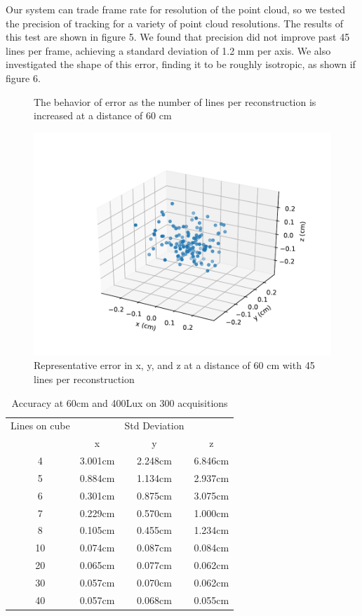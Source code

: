 \documentclass{llncs}
\begin{document}
Our system can trade frame rate for resolution of the point cloud, so we tested the precision of tracking for a variety of point cloud resolutions. The results of this test are shown in figure 5. We found that precision did not improve past 45 lines per frame, achieving a standard deviation of 1.2 mm per axis. We also investigated the shape of this error, finding it to be roughly isotropic, as shown if figure 6. 
\begin{figure}
\caption{The behavior of error as the number of lines per reconstruction is increased at a distance of 60 cm}
\end{figure}
\begin{figure}
\includegraphics[scale=.7]{45_lines_error}
\caption{Representative error in x, y, and z at a distance of 60 cm with 45 lines per reconstruction}
\end{figure}

\begin{table}
\caption{Accuracy at 60cm and 400Lux on 300 acquisitions}
\begin{tabular}{c|ccc}
\hline
\hline
Lines on cube & & Std Deviation & \\
 & x & y & z\\
\hline
4  & 3.001cm & 2.248cm & 6.846cm\\
5  & 0.884cm & 1.134cm & 2.937cm\\
6  & 0.301cm & 0.875cm & 3.075cm\\
7  & 0.229cm & 0.570cm & 1.000cm\\
8  & 0.105cm & 0.455cm & 1.234cm\\
10 & 0.074cm & 0.087cm & 0.084cm\\
20 & 0.065cm & 0.077cm & 0.062cm\\
30 & 0.057cm & 0.070cm & 0.062cm\\
40 & 0.057cm & 0.068cm & 0.055cm\\
\hline

\end{tabular}
\centering
\end{table}
\end{document}
